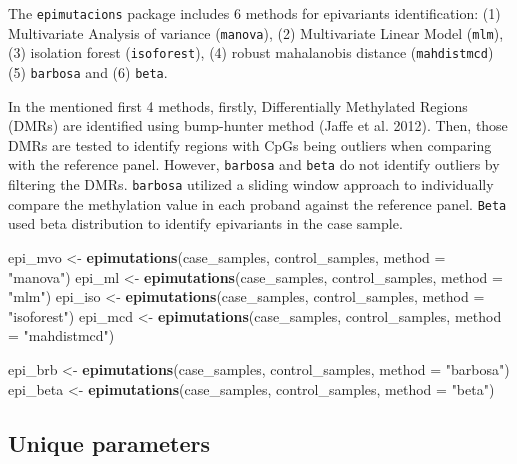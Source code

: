 \documentclass[
]{article}
\newenvironment{Shaded}{\begin{snugshade}}{\end{snugshade}}
\newcommand{\DataTypeTok}[1]{\textcolor[rgb]{0.13,0.29,0.53}{#1}}
\newcommand{\KeywordTok}[1]{\textcolor[rgb]{0.13,0.29,0.53}{\textbf{#1}}}
\newcommand{\NormalTok}[1]{#1}
\newcommand{\StringTok}[1]{\textcolor[rgb]{0.31,0.60,0.02}{#1}}
\begin{document}
The \texttt{epimutacions} package includes 6 methods for epivariants
identification: (1) Multivariate Analysis of variance (\texttt{manova}),
(2) Multivariate Linear Model (\texttt{mlm}), (3) isolation forest
(\texttt{isoforest}), (4) robust mahalanobis distance
(\texttt{mahdistmcd}) (5) \texttt{barbosa} and (6) \texttt{beta}.

In the mentioned first 4 methods, firstly, Differentially Methylated
Regions (DMRs) are identified using bump-hunter method (Jaffe et al.
2012). Then, those DMRs are tested to identify regions with CpGs being
outliers when comparing with the reference panel. However,
\texttt{barbosa} and \texttt{beta} do not identify outliers by filtering
the DMRs. \texttt{barbosa} utilized a sliding window approach to
individually compare the methylation value in each proband against the
reference panel. \texttt{Beta} used beta distribution to identify
epivariants in the case sample.

\begin{Shaded}
\begin{Highlighting}[]
\NormalTok{epi_mvo <-}\StringTok{ }\KeywordTok{epimutations}\NormalTok{(case_samples, control_samples, }\DataTypeTok{method =} \StringTok{"manova"}\NormalTok{)}
\NormalTok{epi_ml <-}\StringTok{ }\KeywordTok{epimutations}\NormalTok{(case_samples, control_samples, }\DataTypeTok{method =} \StringTok{"mlm"}\NormalTok{)}
\NormalTok{epi_iso <-}\StringTok{ }\KeywordTok{epimutations}\NormalTok{(case_samples, control_samples, }\DataTypeTok{method =} \StringTok{"isoforest"}\NormalTok{)}
\NormalTok{epi_mcd <-}\StringTok{ }\KeywordTok{epimutations}\NormalTok{(case_samples, control_samples, }\DataTypeTok{method =} \StringTok{"mahdistmcd"}\NormalTok{)}
\end{Highlighting}
\end{Shaded}

\begin{Shaded}
\begin{Highlighting}[]
\NormalTok{epi_brb <-}\StringTok{ }\KeywordTok{epimutations}\NormalTok{(case_samples, control_samples, }\DataTypeTok{method =} \StringTok{"barbosa"}\NormalTok{)}
\NormalTok{epi_beta <-}\StringTok{ }\KeywordTok{epimutations}\NormalTok{(case_samples, control_samples, }\DataTypeTok{method =} \StringTok{"beta"}\NormalTok{)}
\end{Highlighting}
\end{Shaded}

\hypertarget{unique-parameters}{%
\subsection{Unique parameters}\label{unique-parameters}}
\end{document}
